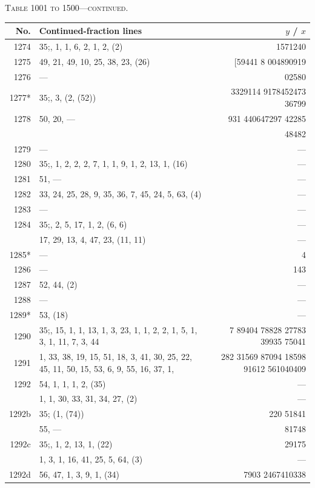 \documentclass[11pt]{article}
\newcommand{\peheading}{%
  \begin{center}\small\textsc{Table 1001 to 1500---continued.}\end{center}
}
\begin{document}
\peheading
\renewcommand{\arraystretch}{1.15}
{\footnotesize
\begin{longtable}{|r|p{8.5cm}|r|}
\hline
\textbf{No.} & \textbf{Continued-fraction lines} & \textbf{$y$ \;/\; $x$}\\
\hline\endhead
1274   & $35$;\; 1, 1, 1, 6, 2, 1, 2, (2) & 1571240 \\
1275   & 49, 21, 49, 10, 25, 38, 23, (26) & [59441 8 004890919 \\
1276   & --- & 02580 \\
1277*  & $35$;\; 1, 3, (2, (52)) & 3329114 9178452473 36799 \\
1278   & 50, 20, --- & 931 440647297 42285 \\
       & & 48482 \\
\hline
1279   & --- & --- \\
1280   & $35$;\; 1, 1, 2, 2, 2, 7, 1, 1, 9, 1, 2, 13, 1, (16) & --- \\
1281   & 51, --- & --- \\
1282   & 33, 24, 25, 28, 9, 35, 36, 7, 45, 24, 5, 63, (4) & --- \\
1283   & --- & --- \\
1284   & $35$;\; 3, 2, 5, 17, 1, 2, (6, 6) & --- \\
       & 17, 29, 13, 4, 47, 23, (11, 11) & --- \\
\hline
1285*  & --- & 4 \\
1286   & --- & 143 \\
1287   & 52, 44, (2) & --- \\
1288   & --- & --- \\
1289*  & 53, (18) & --- \\
\hline
1290   & $35$;\; 17, 15, 1, 1, 13, 1, 3, 23, 1, 1, 2, 2, 1, 5, 1, 3, 1, 11, 7, 3, 44 & 7 89404 78828 27783 39935 75041 \\
1291   & 1, 33, 38, 19, 15, 51, 18, 3, 41, 30, 25, 22, 45, 11, 50, 15, 53, 6, 9, 55, 16, 37, 1, & 282 31569 87094 18598 91612 561040409 \\
1292   & 54, 1, 1, 1, 2, (35) & --- \\
       & 1, 1, 30, 33, 31, 34, 27, (2) & --- \\
\hline
1292b  & $35$;\; (1, (74)) & 220 51841 \\
       & 55, --- & 81748 \\
\hline
1292c  & $35$;\; 3, 1, 2, 13, 1, (22) & 29175 \\
       & 1, 3, 1, 16, 41, 25, 5, 64, (3) & --- \\
\hline
1292d  & 56, 47, 1, 3, 9, 1, (34) & 7903 2467410338 \\

\end{longtable}}
\end{document}
